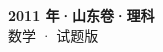 \documentclass[zihao=-4, a4paper]{ctexart}
\begin{document}
\begin{center}
  {\Large\bfseries 2011 年·山东卷·理科}\\[4pt]
  {\large 数学 · 试题版}
\end{center}
\medskip
{}

\end{document}
